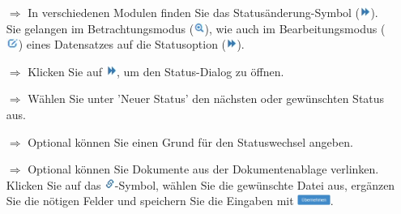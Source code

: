 \documentclass{article}
\begin{document}
\begin{multicols}{2}
\begin{tcolorbox}[colback=blue!5,colframe=blue!40!black,title=Status ändern]
\begin{itemize}
  \item[$\Longrightarrow$] In verschiedenen Modulen finden Sie das Statusänderung-Symbol (\includegraphics[height=10pt]{Icons/Status_aendern.jpg}). Sie gelangen im Betrachtungsmodus (\includegraphics[height=10pt]{Icons/Lupe.jpg}), wie auch im Bearbeitungsmodus (\includegraphics[height=10pt]{Icons/bearbeiten.jpg}) eines Datensatzes auf die Statusoption (\includegraphics[height=10pt]{Icons/Status_aendern.jpg}).
  \item[$\Longrightarrow$] Klicken Sie auf \includegraphics[height=10pt]{Icons/Status_aendern.jpg}, um den Status-Dialog zu öffnen.
  \item[$\Longrightarrow$] Wählen Sie unter 'Neuer Status' den nächsten oder gewünschten Status aus.
  \item[$\Longrightarrow$] Optional können Sie einen Grund für den Statuswechsel angeben.
  \item[$\Longrightarrow$] Optional können Sie Dokumente aus der Dokumentenablage verlinken. Klicken Sie auf das \includegraphics[height=10pt]{Icons/Link.jpg}-Symbol, wählen Sie die gewünschte Datei aus, ergänzen Sie die nötigen Felder und speichern Sie die Eingaben mit \includegraphics[height=10pt]{Icons/B_Uebernehmen.jpg}.

\end{itemize}
\end{tcolorbox}


\end{multicols}

\end{document}
